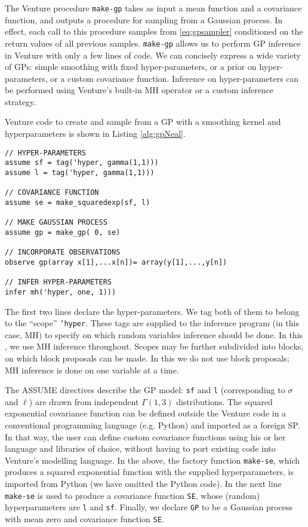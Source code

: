 
The Venture procedure \texttt{make-gp} takes as input a mean function and a covariance function, and outputs a procedure for sampling from a Gaussian process.
In effect, each call to this procedure samples from \eqref{eq:gpsampler} conditioned on the return values of all previous samples.
\texttt{make-gp} allows us to perform GP inference in Venture with only a few lines of code.
We can concisely express a wide variety of GPs: simple smoothing with fixed hyper-parameters, or a prior on hyper-parameters, or a custom covariance function.
Inference on hyper-parameters can be performed using Venture's built-in MH operator or a custom inference strategy.

Venture code to create and sample from a GP with a smoothing kernel and hyperparameters is shown in Listing \ref{alg:gpNeal}.
\begin{minipage}{\linewidth}
\small
\belowcaptionskip=-10pt
\begin{lstlisting}[frame=single,mathescape,label=alg:gpNeal,basicstyle=\selectfont\ttfamily]
// HYPER-PARAMETERS
assume sf = tag('hyper, gamma(1,1)))
assume l = tag('hyper, gamma(1,1)))

// COVARIANCE FUNCTION
assume se = make_squaredexp(sf, l)

// MAKE GAUSSIAN PROCESS
assume gp = make_gp( 0, se)

// INCORPORATE OBSERVATIONS
observe gp(array x[1],...x[n])= array(y[1],...,y[n])

// INFER HYPER-PARAMETERS
infer mh('hyper, one, 1)))

\end{lstlisting}
\end{minipage}


The first two lines declare the hyper-parameters.
We tag both of them to belong to the ``scope'' \texttt{'hyper}.
These tags are supplied to the inference program (in this case, MH) to specify on which random variables inference should be done.
In this \paperOrChapter, we use MH inference throughout.
Scopes may be further subdivided into blocks, on which block proposals can be made.
In this \paperOrChapter we do not use block proposals; MH inference is done on one variable at a time.

The ASSUME directives describe the GP model: \texttt{sf} and \texttt{l} (corresponding to $\sigma$ and $\ell$) are drawn from independent $\Gamma(1,3)$ distributions.
The squared exponential covariance function can be defined outside the Venture code in a conventional programming language (e.g. Python) and imported as a foreign SP.
In that way, the user can define custom covariance functions using his or her language and libraries of choice, without having to port existing code into Venture's modelling language.
In the above, the factory function \texttt{make-se}, which produces a squared exponential function with the supplied hyperparameters, is imported from Python (we have omitted the Python code).
In the next line \texttt{make-se} is used to produce a covariance function \texttt{SE}, whose (random) hyperparameters are \texttt{l} and \texttt{sf}.
Finally, we declare \texttt{GP} to be a Gaussian process with mean zero and covariance function \texttt{SE}.







